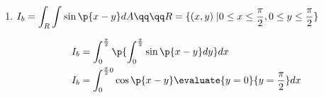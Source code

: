 \begin{enumerate}
	\item $\displaystyle I_b = \int_{R}^{}\int_{}^{}\sin\p{ x-y } dA \qq \qq R = \{(x,y) \; | 0\leq x \leq \frac{\pi }{2} , 0\leq y \leq \frac{\pi }{2} \}$ 
		\begin{center}
		   \begin{align*}
			   I_b &= \int_{0}^{\frac{\pi }{2} }\p{\int_{0}^{\frac{\pi }{2}} \sin\p{ x-y } dy } dx \\ 
			   I_b &= \int_{0}^{\frac{\pi }{2} 0} \cos\p{ x-y } \evaluate{y=0}{y=\frac{\pi }{2} } dx \\ 
		   \end{align*}
		   \begin{comment}
			   \item 
		   \end{comment}
		\end{center}
\end{enumerate}



